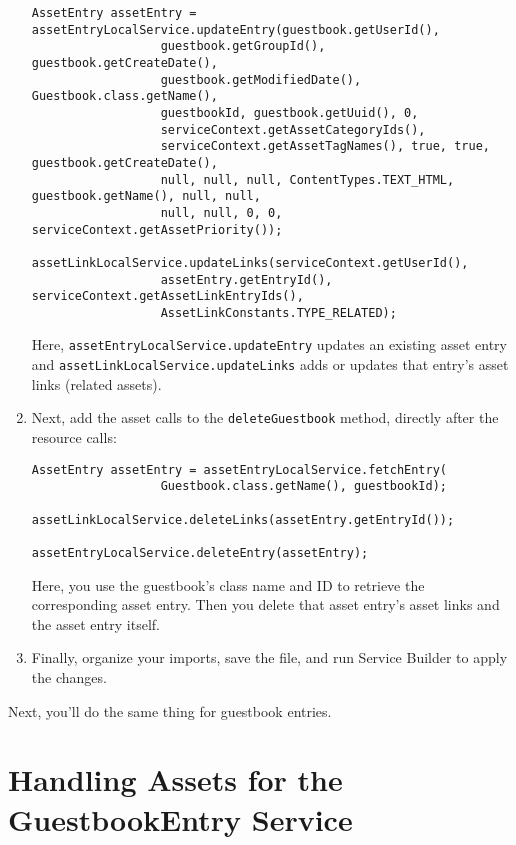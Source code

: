 \begin{enumerate}
\begin{verbatim}
AssetEntry assetEntry = assetEntryLocalService.updateEntry(guestbook.getUserId(),
                  guestbook.getGroupId(), guestbook.getCreateDate(),
                  guestbook.getModifiedDate(), Guestbook.class.getName(),
                  guestbookId, guestbook.getUuid(), 0,
                  serviceContext.getAssetCategoryIds(),
                  serviceContext.getAssetTagNames(), true, true, guestbook.getCreateDate(), 
                  null, null, null, ContentTypes.TEXT_HTML, guestbook.getName(), null, null, 
                  null, null, 0, 0, serviceContext.getAssetPriority());

assetLinkLocalService.updateLinks(serviceContext.getUserId(),
                  assetEntry.getEntryId(), serviceContext.getAssetLinkEntryIds(),
                  AssetLinkConstants.TYPE_RELATED);
\end{verbatim}

  Here, \texttt{assetEntryLocalService.updateEntry} updates an existing
  asset entry and \texttt{assetLinkLocalService.updateLinks} adds or
  updates that entry's asset links (related assets).
\item
  Next, add the asset calls to the \texttt{deleteGuestbook} method,
  directly after the resource calls:

\begin{verbatim}
AssetEntry assetEntry = assetEntryLocalService.fetchEntry(
                  Guestbook.class.getName(), guestbookId);

assetLinkLocalService.deleteLinks(assetEntry.getEntryId());

assetEntryLocalService.deleteEntry(assetEntry);
\end{verbatim}

  Here, you use the guestbook's class name and ID to retrieve the
  corresponding asset entry. Then you delete that asset entry's asset
  links and the asset entry itself.
\item
  Finally, organize your imports, save the file, and run Service Builder
  to apply the changes.
\end{enumerate}

Next, you'll do the same thing for guestbook entries.

\chapter{Handling Assets for the GuestbookEntry
Service}\label{handling-assets-for-the-guestbookentry-service}

